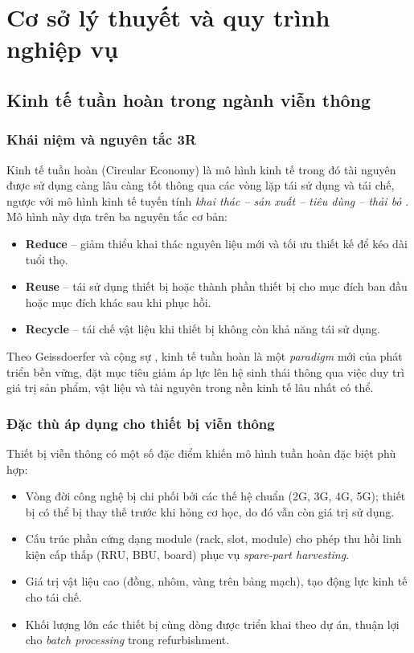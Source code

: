 \chapter{Cơ sở lý thuyết và quy trình nghiệp vụ}
\label{ch:cosolythuyet}

\section{Kinh tế tuần hoàn trong ngành viễn thông}
\label{sec:circular}

\subsection{Khái niệm và nguyên tắc 3R}
Kinh tế tuần hoàn (Circular Economy) là mô hình kinh tế trong đó tài nguyên được sử dụng càng lâu càng tốt thông qua các vòng lặp tái sử dụng và tái chế, ngược với mô hình kinh tế tuyến tính \emph{khai thác -- sản xuất -- tiêu dùng -- thải bỏ} \cite{ellenmacarthur2013}. Mô hình này dựa trên ba nguyên tắc cơ bản:

\begin{itemize}[leftmargin=1.2cm]
    \item \textbf{Reduce} -- giảm thiểu khai thác nguyên liệu mới và tối ưu thiết kế để kéo dài tuổi thọ.
    \item \textbf{Reuse} -- tái sử dụng thiết bị hoặc thành phần thiết bị cho mục đích ban đầu hoặc mục đích khác sau khi phục hồi.
    \item \textbf{Recycle} -- tái chế vật liệu khi thiết bị không còn khả năng tái sử dụng.
\end{itemize}

Theo Geissdoerfer và cộng sự \cite{geissdoerfer2017}, kinh tế tuần hoàn là một \emph{paradigm} mới của phát triển bền vững, đặt mục tiêu giảm áp lực lên hệ sinh thái thông qua việc duy trì giá trị sản phẩm, vật liệu và tài nguyên trong nền kinh tế lâu nhất có thể.

\subsection{Đặc thù áp dụng cho thiết bị viễn thông}
Thiết bị viễn thông có một số đặc điểm khiến mô hình tuần hoàn đặc biệt phù hợp:

\begin{itemize}[leftmargin=1.2cm]
    \item Vòng đời công nghệ bị chi phối bởi các thế hệ chuẩn (2G, 3G, 4G, 5G); thiết bị có thể bị thay thế trước khi hỏng cơ học, do đó vẫn còn giá trị sử dụng.
    \item Cấu trúc phần cứng dạng module (rack, slot, module) cho phép thu hồi linh kiện cấp thấp (RRU, BBU, board) phục vụ \emph{spare-part harvesting}.
    \item Giá trị vật liệu cao (đồng, nhôm, vàng trên bảng mạch), tạo động lực kinh tế cho tái chế.
    \item Khối lượng lớn các thiết bị cùng dòng được triển khai theo dự án, thuận lợi cho \emph{batch processing} trong refurbishment.
\end{itemize}

